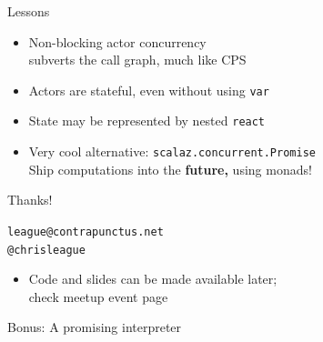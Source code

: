 \documentclass[14pt,t,usepdftitle=false,
xcolornames=x11names,svgnames,dvipsnames]{beamer}
\begin{document}
\begin{frame}{Lessons}
  \begin{itemize}
  \item Non-blocking actor concurrency\\subverts the call graph, much
    like CPS
  \item Actors are stateful, even without using \lstinline:var:
  \item State may be represented by nested \lstinline:react:
  \item Very cool alternative: \lstinline:scalaz.concurrent.Promise:\\
    Ship computations into the \textbf{future,} using monads!
  \end{itemize}
\end{frame}

\begin{frame}{Thanks!}
  \begin{center}
      \texttt{league@contrapunctus.net}\\
      \texttt{@chrisleague}
  \end{center}
  \begin{itemize}
  \item Code and slides can be made available later;\\ check meetup event page
  \end{itemize}
\end{frame}

\begin{frame}[fragile]{Bonus: A promising interpreter}
  
\end{frame}


\end{document}

